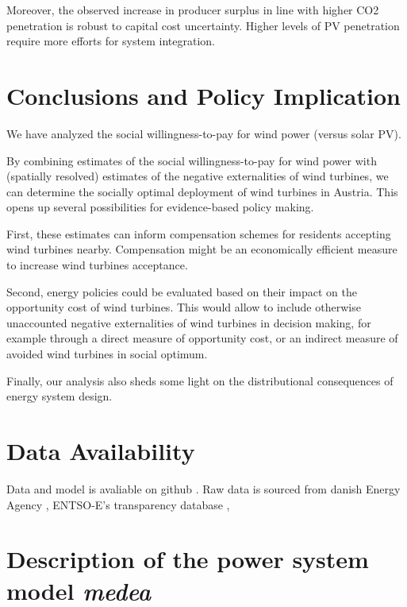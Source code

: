 \documentclass[final, 3p, times]{elsarticle} %
\begin{document}
    Moreover, the observed increase in producer surplus in line with higher CO2 penetration is robust to capital cost uncertainty.
    Higher levels of PV penetration require more efforts for system integration.


    \section{Conclusions and Policy Implication} \label{sec:conclusions-policy-implication}
    We have analyzed the social willingness-to-pay for wind power (versus solar PV).

    By combining estimates of the social willingness-to-pay for wind power with (spatially resolved) estimates of the negative externalities of wind turbines, we can determine the socially optimal deployment of wind turbines in Austria.
    This opens up several possibilities for evidence-based policy making.

    First, these estimates can inform compensation schemes for residents accepting wind turbines nearby.
    Compensation might be an economically efficient measure to increase wind turbines acceptance.

    Second, energy policies could be evaluated based on their impact on the opportunity cost of wind turbines.
    This would allow to include otherwise unaccounted negative externalities of wind turbines in decision making, for example through a direct measure of opportunity cost, or an indirect measure of avoided wind turbines in social optimum.

    Finally, our analysis also sheds some light on the distributional consequences of energy system design.


    \section{Data Availability}\label{sec:data-availability}
    Data and model is avaliable on github \url{}. Raw data is sourced from danish Energy Agency \url{}, ENTSO-E's
    transparency database \url{},

    \newpage
    
    

    \newpage
    \appendix


    \section{Description of the power system model \emph{medea}} \label{sec:medea}
\end{document}
